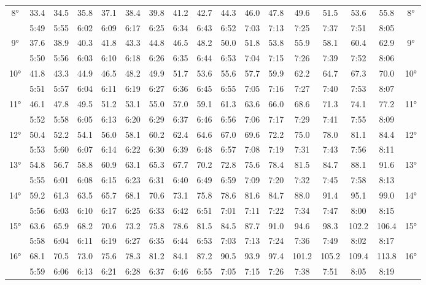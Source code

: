\begin{footnotesize}
\begin{tabular}{c || c | c | c | c | c | c | c | c | c | c | c | c | c | c | c || c}
		\multirow{2}{*}{8°}&33.4&34.5&35.8&37.1&38.4&39.8&41.2&42.7&44.3&46.0&47.8&49.6&51.5&53.6&55.8&\multirow{2}{*}{8°}\\ \space&5:49&5:55&6:02&6:09&6:17&6:25&6:34&6:43&6:52&7:03&7:13&7:25&7:37&7:51&8:05&\space\\\hline
		\multirow{2}{*}{9°}&37.6&38.9&40.3&41.8&43.3&44.8&46.5&48.2&50.0&51.8&53.8&55.9&58.1&60.4&62.9&\multirow{2}{*}{9°}\\ \space&5:50&5:56&6:03&6:10&6:18&6:26&6:35&6:44&6:53&7:04&7:15&7:26&7:39&7:52&8:06&\space\\\hline
		\multirow{2}{*}{10°}&41.8&43.3&44.9&46.5&48.2&49.9&51.7&53.6&55.6&57.7&59.9&62.2&64.7&67.3&70.0&\multirow{2}{*}{10°}\\ \space&5:51&5:57&6:04&6:11&6:19&6:27&6:36&6:45&6:55&7:05&7:16&7:27&7:40&7:53&8:07&\space\\\hline
		\multirow{2}{*}{11°}&46.1&47.8&49.5&51.2&53.1&55.0&57.0&59.1&61.3&63.6&66.0&68.6&71.3&74.1&77.2&\multirow{2}{*}{11°}\\ \space&5:52&5:58&6:05&6:13&6:20&6:29&6:37&6:46&6:56&7:06&7:17&7:29&7:41&7:55&8:09&\space\\\hline
		\multirow{2}{*}{12°}&50.4&52.2&54.1&56.0&58.1&60.2&62.4&64.6&67.0&69.6&72.2&75.0&78.0&81.1&84.4&\multirow{2}{*}{12°}\\ \space&5:53&5:60&6:07&6:14&6:22&6:30&6:39&6:48&6:57&7:08&7:19&7:31&7:43&7:56&8:11&\space\\\hline
		\multirow{2}{*}{13°}&54.8&56.7&58.8&60.9&63.1&65.3&67.7&70.2&72.8&75.6&78.4&81.5&84.7&88.1&91.6&\multirow{2}{*}{13°}\\ \space&5:55&6:01&6:08&6:15&6:23&6:31&6:40&6:49&6:59&7:09&7:20&7:32&7:45&7:58&8:13&\space\\\hline
		\multirow{2}{*}{14°}&59.2&61.3&63.5&65.7&68.1&70.6&73.1&75.8&78.6&81.6&84.7&88.0&91.4&95.1&99.0&\multirow{2}{*}{14°}\\ \space&5:56&6:03&6:10&6:17&6:25&6:33&6:42&6:51&7:01&7:11&7:22&7:34&7:47&8:00&8:15&\space\\\hline
		\multirow{2}{*}{15°}&63.6&65.9&68.2&70.6&73.2&75.8&78.6&81.5&84.5&87.7&91.0&94.6&98.3&102.2&106.4&\multirow{2}{*}{15°}\\ \space&5:58&6:04&6:11&6:19&6:27&6:35&6:44&6:53&7:03&7:13&7:24&7:36&7:49&8:02&8:17&\space\\\hline
		\multirow{2}{*}{16°}&68.1&70.5&73.0&75.6&78.3&81.2&84.1&87.2&90.5&93.9&97.4&101.2&105.2&109.4&113.8&\multirow{2}{*}{16°}\\ \space&5:59&6:06&6:13&6:21&6:28&6:37&6:46&6:55&7:05&7:15&7:26&7:38&7:51&8:05&8:19&\space\\\hline

\end{tabular}
\end{footnotesize}
